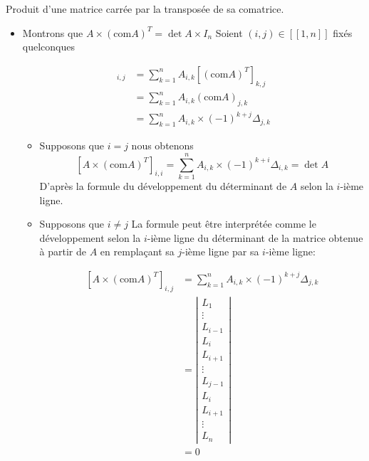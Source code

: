 \documentclass{article}
\begin{document}
\begin{question_kholle}[{Soit $A \in \mathcal{M}_{n}(\K)$.
    Alors $A \times (\mathrm{com} A)^{T} = (\mathrm{com}A)^{T}\times A = \det A \times I_{n}$
    }]{Produit d'une matrice carrée par la transposée de sa comatrice.}
    
    \begin{itemize}[label=$\lozenge$]
        \item Montrons que $A \times (\mathrm{com}A)^{T}=\det A \times I_{n}$
        Soient $(i, j) \in [ \! [ 1, n ] \!]$ fixés quelconques
        
        \begin{align*}
            [A \times (\mathrm{com}A)^{T}]_{i,j} &= \sum_{k=1}^{n}A_{i,k}[(\mathrm{com}A)^{T}]_{k,j} \\
            &=\sum_{k=1}^{n}A_{i,k}(\mathrm{com}A)_{j,k} \\
            &= \sum _{k=1}^{n}A_{i,k}\times (-1)^{k+j}\Delta_{j,k}
        \end{align*}
        
        \begin{itemize}[label=$\star$]
            \item Supposons que $i = j$ nous obtenons
$$
            [A\times(\mathrm{com}A)^{T}]_{i,i} = \sum_{k=1}^{n}A_{i,k}\times(-1)^{k+i}\Delta_{i,k} = \det A
$$
            D'après la formule du développement du déterminant de $A$ selon la $i$-ième ligne.
            
            \item Supposons que $i \neq j$
            La formule peut être interprétée comme le développement selon la $i$-ième ligne du déterminant de la matrice obtenue à partir de $A$ en remplaçant sa $j$-ième ligne par sa $i$-ième ligne:
            
            \begin{align*}
                \left[ A\times (\mathrm{com}A)^{T} \right] _{i,j} &= \sum_{k=1}^{n}A_{i,k}\times(-1)^{k+j}\Delta_{j,k} \\
                &=\left| \begin{array}{c}
                    L_{1} \\
                    \hline 
                    \vdots \\
                    \hline
                    L_{i-1} \\
                    \hline 
                    L_{i} \\
                    \hline L_{i+1} \\
                    \hline \vdots \\
                    \hline L_{j-1} \\
                    \hline L_{i} \\
                    \hline L_{i+1} \\
                    \hline \vdots \\
                    \hline L_{n}
                \end{array} \right|  \\
                &=0
            \end{align*}
            

\end{itemize}
\end{itemize}
\end{question_kholle}
\end{document}
